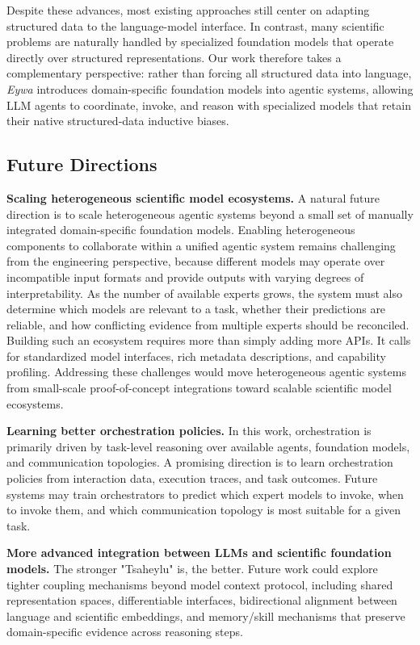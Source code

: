 \documentclass{llmxive}
\begin{document}
{Despite these advances, most existing approaches still center on adapting structured data to the language-model interface. In contrast, many scientific problems are naturally handled by specialized foundation models that operate directly over structured representations. Our work therefore takes a complementary perspective: rather than forcing all structured data into language, \textit{Eywa} introduces domain-specific foundation models into agentic systems, allowing LLM agents to coordinate, invoke, and reason with specialized models that retain their native structured-data inductive biases.


\subsection{Future Directions}

\textbf{Scaling heterogeneous scientific model ecosystems.}
A natural future direction is to scale heterogeneous agentic systems beyond a small set of manually integrated domain-specific foundation models. Enabling heterogeneous components to collaborate within a unified agentic system remains challenging from the engineering perspective, because different models may operate over incompatible input formats and provide outputs with varying degrees of interpretability. As the number of available experts grows, the system must also determine which models are relevant to a task, whether their predictions are reliable, and how conflicting evidence from multiple experts should be reconciled.
Building such an ecosystem requires more than simply adding more APIs. It calls for standardized model interfaces, rich metadata descriptions, and capability profiling. Addressing these challenges would move heterogeneous agentic systems from small-scale proof-of-concept integrations toward scalable scientific model ecosystems.

\textbf{Learning better orchestration policies.}
In this work, orchestration is primarily driven by task-level reasoning over available agents, foundation models, and communication topologies. A promising direction is to learn orchestration policies from interaction data, execution traces, and task outcomes. Future systems may train orchestrators to predict which expert models to invoke, when to invoke them, and which communication topology is most suitable for a given task.

\textbf{More advanced integration between LLMs and scientific foundation models.}
The stronger "Tsaheylu" is, the better. Future work could explore tighter coupling mechanisms beyond model context protocol, including shared representation spaces, differentiable interfaces, bidirectional alignment between language and scientific embeddings, and memory/skill mechanisms that preserve domain-specific evidence across reasoning steps.


}
\end{document}
